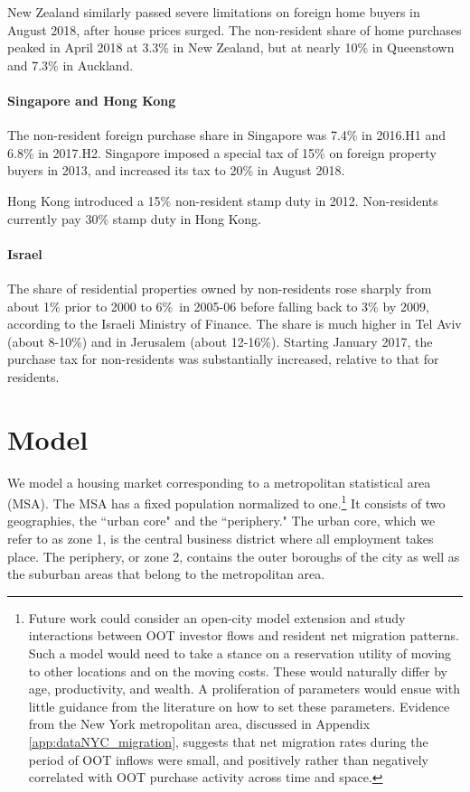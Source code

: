 \documentclass[letterpaper,12pt,dvipsnames,usenames]{article}
\theoremstyle{definition}
\begin{document}
\begin{spacing}{1.25}
 New Zealand similarly passed severe limitations on foreign home buyers in August 2018, after house prices surged. The non-resident share of home purchases peaked in April 2018 at 3.3\% in New Zealand, but at nearly 10\% in Queenstown and 7.3\% in Auckland.\

\paragraph{Singapore and Hong Kong}
The non-resident foreign purchase share in Singapore was 7.4\% in 2016.H1 and 6.8\% in 2017.H2. Singapore imposed a special tax of 15\% on foreign property buyers in 2013, and increased its tax to 20\% in August 2018.

Hong Kong introduced a 15\% non-resident stamp duty in 2012. Non-residents currently pay 30\% stamp duty in Hong Kong.

\paragraph{Israel} The share of residential properties owned by non-residents rose sharply from about 1\% prior to 2000 to 6\%\ in 2005-06 before falling back to 3\% by 2009, according to the Israeli Ministry of Finance. The share is much higher in Tel Aviv (about 8-10\%) and in Jerusalem (about 12-16\%). Starting January 2017, the purchase tax for non-residents was substantially increased, relative to that for residents.


\section{Model}

We model a housing market corresponding to a metropolitan statistical area (MSA). The MSA has a fixed population normalized to one.\footnote{Future work could consider an open-city model extension and study interactions between OOT investor flows and resident net migration patterns. Such a model would need to take a stance on a reservation utility of moving to other locations and on the moving costs. These would naturally differ by age, productivity, and wealth. A proliferation of parameters would ensue with little guidance from the literature on how to set these parameters. Evidence from the New York metropolitan area, discussed in Appendix \ref{app:dataNYC_migration}, suggests that net migration rates during the period of OOT inflows were small, and positively rather than negatively correlated with OOT purchase activity across time and space.} It consists of two geographies, the ``urban core" and the ``periphery." The urban core, which we refer to as zone 1, is the central business district  where all employment takes place. The periphery, or zone 2, contains the outer boroughs of the city as well as the suburban areas that belong to the metropolitan area.



\end{spacing}
\end{document}
